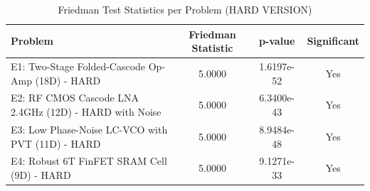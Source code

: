 \begin{table}[htbp]
\centering
\caption{Friedman Test Statistics per Problem (HARD VERSION)}
\label{tab:friedman_stats}
\small
\begin{tabular}{lccc}
\toprule
\textbf{Problem} & \textbf{Friedman Statistic} & \textbf{p-value} & \textbf{Significant} \\
\midrule
E1: Two-Stage Folded-Cascode Op-Amp (18D) - HARD & 5.0000 & 1.6197e-52 & Yes \\
E2: RF CMOS Cascode LNA 2.4GHz (12D) - HARD with Noise & 5.0000 & 6.3400e-43 & Yes \\
E3: Low Phase-Noise LC-VCO with PVT (11D) - HARD & 5.0000 & 8.9484e-48 & Yes \\
E4: Robust 6T FinFET SRAM Cell (9D) - HARD & 5.0000 & 9.1271e-33 & Yes \\
\bottomrule
\end{tabular}
\end{table}
